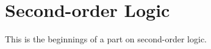 \documentclass[../../include/open-logic-part]{subfiles}
\begin{document}
\part{Second-order Logic}

\begin{editorial}
This is the beginnings of a part on second-order logic.
\end{editorial}




\OLEndPartHook
\end{document}
